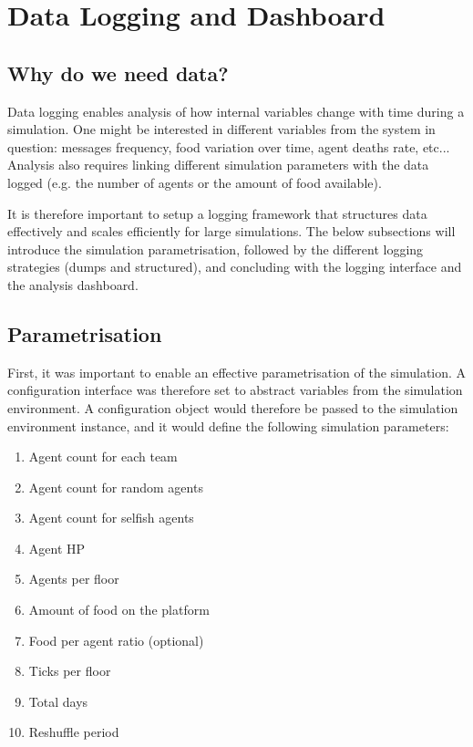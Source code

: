 \chapter{Data Logging and Dashboard}\label{data_logging}

\section{Why do we need data?}

Data logging enables analysis of how internal variables change with time during a simulation. One might be interested in different variables from the system in question: messages frequency, food variation over time, agent deaths rate, etc... Analysis also requires linking different simulation parameters with the data logged (e.g. the number of agents or the amount of food available). 

It is therefore important to setup a logging framework that structures data effectively and scales efficiently for large simulations. The below subsections will introduce the simulation parametrisation, followed by the different logging strategies (dumps and structured), and concluding with the logging interface and the analysis dashboard.

\section{Parametrisation}

First, it was important to enable an effective parametrisation of the simulation. A configuration interface was therefore set to abstract variables from the simulation environment. A configuration object would therefore be passed to the simulation environment instance, and it would define the following simulation parameters:

\begin{multicols}{2}
    \begin{enumerate}
        \item Agent count for each team
        \item Agent count for random agents
        \item Agent count for selfish agents
        \item Agent HP
        \item Agents per floor
        \item Amount of food on the platform
        \item Food per agent ratio (optional)
        \item Ticks per floor
        \item Total days
        \item Reshuffle period
    \end{enumerate}
\end{multicols}

